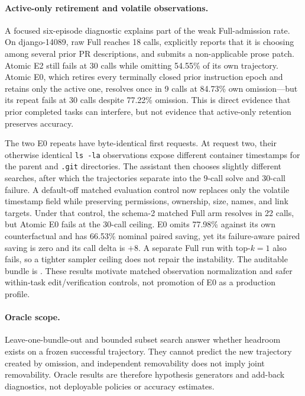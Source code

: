 \documentclass[11pt]{article}
\begin{document}
\paragraph{Active-only retirement and volatile observations.}
A focused six-episode diagnostic explains part of the weak Full-admission
rate.  On django-14089, raw Full reaches 18 calls, explicitly reports that it
is choosing among several prior PR descriptions, and submits a non-applicable
prose patch.  Atomic E2 still fails at 30 calls while omitting 54.55\% of its
own trajectory.  Atomic E0, which retires every terminally closed prior
instruction epoch and retains only the active one, resolves once in 9 calls
at 84.73\% own omission---but its repeat fails at 30 calls despite 77.22\%
omission.  This is direct evidence that prior completed tasks can interfere,
but not evidence that active-only retention preserves accuracy.

The two E0 repeats have byte-identical first requests.  At request two, their
otherwise identical \texttt{ls -la} observations expose different container
timestamps for the parent and \texttt{.git} directories.  The assistant then
chooses slightly different searches, after which the trajectories separate
into the 9-call solve and 30-call failure.  A default-off matched evaluation
control now replaces only the volatile timestamp field while preserving
permissions, ownership, size, names, and link targets.  Under that control,
the schema-2 matched Full arm resolves in 22 calls, but Atomic E0 fails at the
30-call ceiling.  E0 omits 77.98\% against its own counterfactual and has
66.53\% nominal paired saving, yet its failure-aware paired saving is zero and
its call delta is $+8$.  A separate Full run with top-$k=1$ also fails, so a
tighter sampler ceiling does not repair the instability.  The auditable
bundle is .  These results motivate
matched observation normalization and safer within-task edit/verification
controls, not promotion of E0 as a production profile.

\paragraph{Oracle scope.}
Leave-one-bundle-out and bounded subset search answer whether headroom exists
on a frozen successful trajectory.  They cannot predict the new trajectory
created by omission, and independent removability does not imply joint
removability.  Oracle results are therefore hypothesis generators and add-back
diagnostics, not deployable policies or accuracy estimates.
\end{document}
